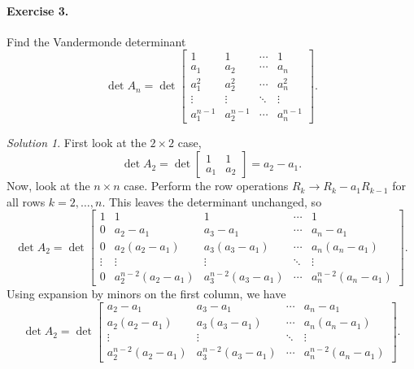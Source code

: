 \documentclass[11pt]{report}
\theoremstyle{remark}
\newtheorem*{solution}{Solution}
\begin{document}
    \paragraph{Exercise 3.} Find the Vandermonde determinant \[
        \det{A_n} = \det \begin{bmatrix}
            1 & 1 & \cdots & 1 \\
            a_1 & a_2 & \cdots & a_n \\
            a_1^2 & a_2^2 & \cdots & a_n^2 \\
            \vdots & \vdots & \ddots & \vdots \\
            a_1^{n - 1} & a_2^{n - 1} & \cdots & a_n^{n - 1}
        \end{bmatrix}.
    \] 
    \begin{solution}
        First look at the $2 \times 2$ case, \[
            \det{A_2} = \det \begin{bmatrix}
                1 & 1 \\ a_1 & a_2
            \end{bmatrix}
            = a_2 - a_1.
        \] Now, look at the $n \times n$ case. Perform the row operations $R_k \to
        R_k - a_1R_{k - 1}$ for all rows $k = 2, \dots, n$. This leaves the
        determinant unchanged, so \[
            \det{A_2} = \det \begin{bmatrix}
                1 & 1 & 1 & \cdots & 1 \\
                0 & a_2 - a_1 & a_3 - a_1 & \cdots & a_n - a_1 \\
                0 & a_2(a_2 - a_1) & a_3(a_3 - a_1) & \cdots & a_n(a_n - a_1) \\
                \vdots & \vdots & \vdots & \ddots & \vdots \\
                0 & a_2^{n - 2}(a_2 - a_1) & a_3^{n - 2}(a_3 - a_1) & \cdots &
                a_n^{n - 2}(a_n - a_1)
            \end{bmatrix}.
        \] Using expansion by minors on the first column, we have \[
            \det{A_2} = \det \begin{bmatrix}
                 a_2 - a_1 & a_3 - a_1 & \cdots & a_n - a_1 \\
                 a_2(a_2 - a_1) & a_3(a_3 - a_1) & \cdots & a_n(a_n - a_1) \\
                \vdots & \vdots & \ddots & \vdots \\
                a_2^{n - 2}(a_2 - a_1) & a_3^{n - 2}(a_3 - a_1) & \cdots &
                a_n^{n - 2}(a_n - a_1)
            \end{bmatrix}.
\]
\end{solution}
\end{document}
